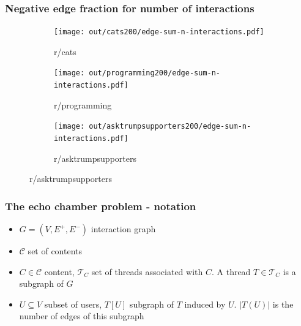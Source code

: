 \documentclass{beamer}
\begin{document}
\begin{frame}[c]
    \frametitle{Negative edge fraction for number of interactions}
    \begin{figure}
        \begin{center}
            \begin{subfigure}[b]{0.3\textwidth}
                \centering
                \texttt{[image: out/cats200/edge-sum-n-interactions.pdf]}
                \caption{r/cats}
            \end{subfigure}
            \begin{subfigure}[b]{0.3\textwidth}
                \centering
                \texttt{[image: out/programming200/edge-sum-n-interactions.pdf]}
                \caption{r/programming}
            \end{subfigure}
            \begin{subfigure}[b]{0.4\textwidth}
                \centering
                \texttt{[image: out/asktrumpsupporters200/edge-sum-n-interactions.pdf]}
                \caption{r/asktrumpsupporters}
            \end{subfigure}
        \end{center}
    \end{figure}

\end{frame}

\begin{frame}[c]
    \frametitle{The echo chamber problem - notation}
    \begin{itemize}
        \item $G = (V, E ^{+}, E ^{-}) $ interaction graph
        \item $ \mathcal{C} $ set of contents
        \item $C \in \mathcal{C} $ content, $\mathcal{T} _{C} $ set of threads
            associated with $C$. A thread $T \in \mathcal{T} _{C} $ is a
            subgraph of $G$
        \item $U \subseteq V$ subset of users, $T[U]$ subgraph of $T$ induced
            by $U$. $|T(U)|$ is the number of edges of this subgraph
    \end{itemize}
\end{frame}
\end{document}
